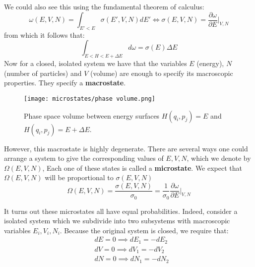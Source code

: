 \documentclass[a4paper,11pt,oneside]{book}
\begin{document}
We could also see this using the fundamental theorem of calculus:
\begin{equation}
    \omega(E,V,N) = \int_{E'<E} \sigma(E',V,N) dE' \iff \sigma(E,V,N) = \frac{\partial \omega}{\partial E}\bigg|_{V,N}
\end{equation}
from which it follows that:
\begin{equation}
    \int_{E<H<E+\Delta E} d\omega = \sigma(E) \Delta E
\end{equation}
Now for a closed, isolated system we have that the variables $E$ (energy), $N$ (number of particles) and $V$ (volume) are enough to specify its macroscopic properties. They specify a \textbf{macrostate}.
\begin{figure}[h!]
    \centering
    \texttt{[image: microstates/phase volume.png]}
    \caption{Phase space volume between energy surfaces $H(q_i,p_j)=E$ and $H(q_i,p_j)=E+\Delta E$.}
    \label{fig:my_label}
\end{figure}

However, this macrostate is highly degenerate. There are several ways one could arrange a system to give the corresponding values of $E,V,N$, which we denote by $\Omega(E,V,N)$, Each one of these states is called a \textbf{microstate}. We expect that $\Omega(E,V,N)$ will be proportional to $\sigma(E,V,N)$
\begin{equation}\label{cavalieri}
   \boxed{\Omega(E,V,N) = \frac{\sigma(E,V,N)}{\sigma_0} = \frac{1}{\sigma_0} \frac{\partial \omega}{\partial E}\bigg|_{V,N}}
\end{equation}


It turns out these microstates all have equal probabilities. Indeed, consider a isolated system which we subdivide into two subsystems with macroscopic variables $E_i, V_i, N_i$. Because the original system is closed, we require that:
\begin{align}
    &dE = 0 \implies dE_1 = - dE_2\\
    &dV = 0 \implies dV_1 = - dV_2\\
    &dN = 0 \implies dN_1 = - dN_2
\end{align}
\end{document}

